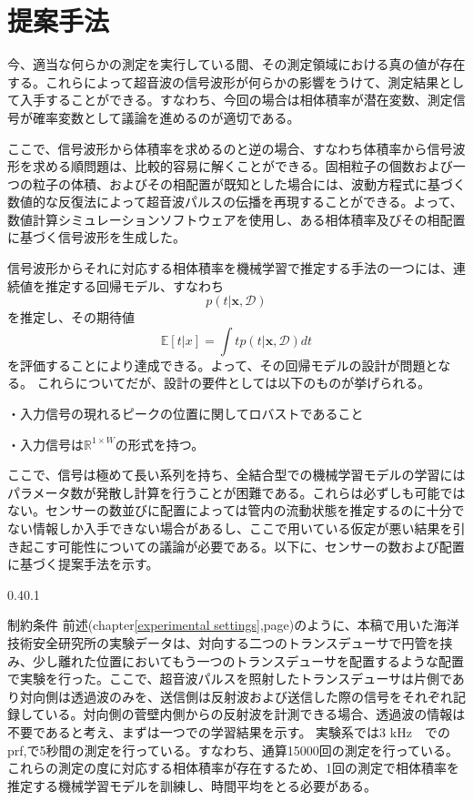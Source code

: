 \documentclass[uplatex]{suribt}
\makeatletter
\renewcommand{\subsection}{%
    \@startsection{subsection}{1}{\z@}%
    {0.4\Cvs}{0.1\Cvs}%
    {\normalfont\normalsize\headfont\raggedright}}
\makeatother
\begin{document}
\section{提案手法}
今、適当な何らかの測定を実行している間、その測定領域における真の値が存在する。これらによって超音波の信号波形が何らかの影響をうけて、測定結果として入手することができる。すなわち、今回の場合は相体積率が潜在変数、測定信号が確率変数として議論を進めるのが適切である。\par
ここで、信号波形から体積率を求めるのと逆の場合、すなわち体積率から信号波形を求める順問題は、比較的容易に解くことができる。固相粒子の個数および一つの粒子の体積、およびその相配置が既知とした場合には、波動方程式に基づく数値的な反復法によって超音波パルスの伝播を再現することができる。よって、数値計算シミュレーションソフトウェアを使用し、ある相体積率及びその相配置に基づく信号波形を生成した。\par
信号波形からそれに対応する相体積率を機械学習で推定する手法の一つには、連続値を推定する回帰モデル、すなわち
\begin{equation}
    p(t | \mathbf{x}, \mathcal{D})
\end{equation}
を推定し、その期待値
\begin{equation}
    \mathbb{E}[t | x ] = \int t p(t |\mathbf{x},\mathcal{D})dt 
\end{equation}
を評価することにより達成できる。よって、その回帰モデルの設計が問題となる。
これらについてだが、設計の要件としては以下のものが挙げられる。\par
・入力信号の現れるピークの位置に関してロバストであること\par
・入力信号は$\mathbb{R}^{1\times W}$の形式を持つ。\par
ここで、信号は極めて長い系列を持ち、全結合型での機械学習モデルの学習にはパラメータ数が発散し計算を行うことが困難である。これらは必ずしも可能ではない。センサーの数並びに配置によっては管内の流動状態を推定するのに十分でない情報しか入手できない場合があるし、ここで用いている仮定が悪い結果を引き起こす可能性についての議論が必要である。以下に、センサーの数および配置に基づく提案手法を示す。\par
\subsection{制約条件}
前述(chapter\ref{experimental settings},page\pageref{experimental settings})のように、本稿で用いた海洋技術安全研究所の実験データは、対向する二つのトランスデューサで円管を挟み、少し離れた位置においてもう一つのトランスデューサを配置するような配置で実験を行った。ここで、超音波パルスを照射したトランスデューサは片側であり対向側は透過波のみを、送信側は反射波および送信した際の信号をそれぞれ記録している。対向側の菅壁内側からの反射波を計測できる場合、透過波の情報は不要であると考え、まずは一つでの学習結果を示す。
実験系では3 kHz　でのprf,で5秒間の測定を行っている。すなわち、通算15000回の測定を行っている。これらの測定の度に対応する相体積率が存在するため、1回の測定で相体積率を推定する機械学習モデルを訓練し、時間平均をとる必要がある。
\end{document}
